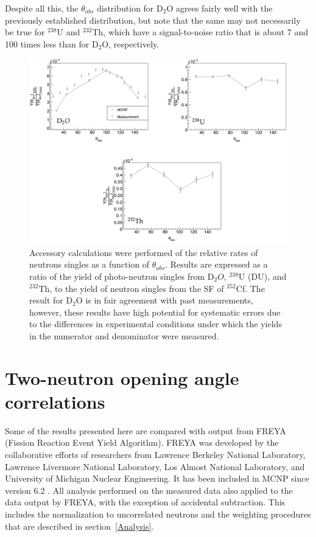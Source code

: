 Despite all this, the $\theta_{abs}$ distribution for D$_{2}$O agrees fairly well with the previously established distribution, but note that the same may not necessarily be true for $^{238}$U and $^{232}$Th, which have a signal-to-noise ratio that is about 7 and 100 times less than for D$_{2}$O, respectively.

\begin{figure}
    \includegraphics[width = 1\textwidth]{Content/Results/Singles.png}
    \caption{Accessory calculations were performed of the relative rates of neutrons singles as a function of $\theta_{abs}$. 
    Results are expressed as a ratio of the yield of photo-neutron singles from D$_{2}O$, $^{238}$U (DU), and $^{232}$Th, to the yield of neutron singles from the SF of $^{252}$Cf.
   The result for D$_{2}$O is in fair agreement with past measurements, however, these results have high potential for systematic errors due to the differences in experimental conditions under which the yields in the numerator and denominator were measured.
       }
    \label{fig:Singles}
\end{figure}

\FloatBarrier
\section{Two-neutron opening angle correlations}
Some of the results presented here are compared with output from FREYA (Fission Reaction Event Yield Algorithm). 
FREYA was developed by the collaborative efforts of researchers from Lawrence Berkeley National Laboratory,  Lawrence Livermore National Laboratory, Los Almost National Laboratory, and University of Michigan Nuclear Engineering.
It has been included in MCNP since version 6.2 .
All analysis performed on the measured data also applied to the data output by FREYA, with the exception of accidental subtraction.
This includes the normalization to uncorrelated neutrons and the weighting procedures that are described in section~\ref{Analysis}.
 
